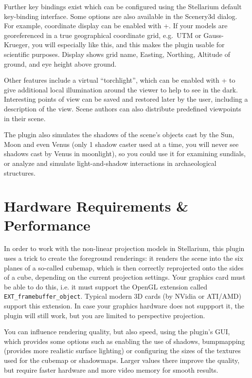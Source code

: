 Further key bindings exist which can be configured using the Stellarium default
key-binding interface. Some options are also available in the Scenery3d dialog.
For example, coordinate display can be enabled with +. If your models are georeferenced
in a true geographical coordinate grid, e.g.\ UTM or Gauss-Krueger, you will
especially like this, and this makes the plugin usable for scientific purposes.
Display shows grid name, Easting, Northing, Altitude of ground, and eye height
above ground.

Other features include a virtual ``torchlight'', which can be enabled with + to give
additional local illumination around the viewer to help to see in the dark.
Interesting points of view can be saved and restored later by the user,
including a description of the view. Scene authors can also distribute
predefined viewpoints in their scene.

The plugin also simulates the shadows of the scene's objects cast by
the Sun, Moon and even Venus (only 1 shadow caster used at a time, you
will never see shadows cast by Venus in moonlight), so you could use
it for examining sundials, or analyze and simulate light-and-shadow
interactions in archaeological structures.

\section{Hardware Requirements \& Performance}
\label{sec:scenery3d:HardwareRequirements}

In order to work with the non-linear projection models in Stellarium,
this plugin uses a trick to create the foreground renderings: it
renders the scene into the six planes of a so-called cubemap, which is
then correctly reprojected onto the sides of a cube, depending on the
current projection settings. Your graphics card must be able to do
this, i.e. it must support the OpenGL extension called
\texttt{EXT\_framebuffer\_object}. Typical modern 3D cards (by NVidia
or ATI/AMD) support this extension. In case your graphics hardware
does not suppport it, the plugin will still work, but you are limited
to perspective projection.

You can influence rendering quality, but also speed, using the plugin's 
GUI, which provides some options such as enabling the use
of shadows, bumpmapping (provides more realistic surface lighting) or 
configuring the sizes of the textures used
for the cubemap or shadowmaps. Larger values there improve the quality,
but require faster hardware and more video memory for smooth results.

